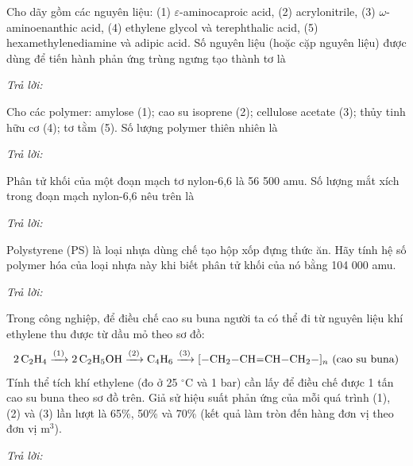 \documentclass[11pt,a4paper]{article}
\def\loigiai#1{}
\begin{document}
\setcounter{ex}{0}

\begin{ex}
Cho dãy gồm các nguyên liệu: (1) $\varepsilon$-aminocaproic acid, (2) acrylonitrile, (3) $\omega$-aminoenanthic acid, (4) ethylene glycol và terephthalic acid, (5) hexamethylenediamine và adipic acid. Số nguyên liệu (hoặc cặp nguyên liệu) được dùng để tiến hành phản ứng trùng ngưng tạo thành tơ là
\par\noindent\textit{Trả lời:} \dotfill
\loigiai{}
\end{ex}

\begin{ex}
Cho các polymer: amylose (1); cao su isoprene (2); cellulose acetate (3); thủy tinh hữu cơ (4); tơ tằm (5). Số lượng polymer thiên nhiên là
\par\noindent\textit{Trả lời:} \dotfill
\loigiai{}
\end{ex}

\begin{ex}
Phân tử khối của một đoạn mạch tơ nylon-6,6 là 56 500 amu. Số lượng mắt xích trong đoạn mạch nylon-6,6 nêu trên là
\par\noindent\textit{Trả lời:} \dotfill
\loigiai{}
\end{ex}

\begin{ex}
Polystyrene (PS) là loại nhựa dùng chế tạo hộp xốp đựng thức ăn. Hãy tính hệ số polymer hóa của loại nhựa này khi biết phân tử khối của nó bằng 104 000 amu.
\par\noindent\textit{Trả lời:} \dotfill
\loigiai{}
\end{ex}

\begin{ex}
Trong công nghiệp, để điều chế cao su buna người ta có thể đi từ nguyên liệu khí ethylene thu được từ dầu mỏ theo sơ đồ:
$$2\,\ce{C2H4} \xrightarrow{(1)} 2\,\ce{C2H5OH} \xrightarrow{(2)} \ce{C4H6} \xrightarrow{(3)} \ce{[-CH2-CH=CH-CH2-]_n}\text{ (cao su buna)}$$
Tính thể tích khí ethylene (đo ở 25 $^\circ\text{C}$ và 1 bar) cần lấy để điều chế được 1 tấn cao su buna theo sơ đồ trên. Giả sử hiệu suất phản ứng của mỗi quá trình (1), (2) và (3) lần lượt là 65\%, 50\% và 70\% (kết quả làm tròn đến hàng đơn vị theo đơn vị $\text{m}^3$).
\par\noindent\textit{Trả lời:} \dotfill
\loigiai{}
\end{ex}
\end{document}

